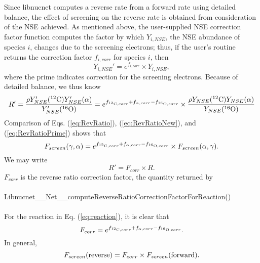 \documentclass{article}    %
\begin{document}
Since libnucnet computes a reverse rate from a forward rate using detailed
balance, the effect of screening on the reverse rate is obtained from
consideration of the NSE achieved.
As mentioned above,
the user-supplied NSE correction factor function
computes the factor by which $Y_{i,NSE}$, the
NSE abundance of species $i$,
changes due to the screening electrons; thus, if the user's routine
returns the correction factor $f_{i,corr}$ for species $i$, then
\begin{equation}
Y_{i,NSE}' = e^{f_{i,corr}} \times Y_{i,NSE},
\label{eq:newNse}
\end{equation}
where the prime indicates correction for the screening electrons.  Because
of detailed balance, we thus know
\begin{equation}
R' =
\frac{\rho Y_{NSE}'(^{12}{\rm C}) Y_{NSE}'(\alpha )}{Y_{NSE}'(^{16}{\rm O})}
= e^{f_{^{12}{\rm C},corr} + f_{\alpha,corr} - f_{^{16}{\rm O},corr}} \times
\frac{\rho Y_{NSE}(^{12}{\rm C}) Y_{NSE}(\alpha )}{Y_{NSE}(^{16}{\rm O})}
\label{eq:RevRatioPrime}
\end{equation}
Comparison of Eqs. (\ref{eq:RevRatio}), (\ref{eq:RevRatioNew}),
and (\ref{eq:RevRatioPrime}) shows that
\begin{equation}
F_{screen}(\gamma,\alpha) =
e^{f_{^{12}{\rm C},corr} + f_{\alpha,corr} - f_{^{16}{\rm O},corr} } \times
F_{screen}(\alpha,\gamma).
\end{equation}
We may write
\begin{equation}
R' = F_{corr} \times R.
\end{equation}
$F_{corr}$ is the reverse ratio correction factor, the quantity returned by\\
\\
Libnucnet\_\_Net\_\_computeReverseRatioCorrectionFactorForReaction()\\
\\
For the reaction in Eq. (\ref{eq:reaction}), it is clear that
\begin{equation}
F_{corr} = e^{f_{^{12}{\rm C},corr} + f_{\alpha,corr} - f_{^{16}{\rm O},corr}}.
\end{equation}
In general,
\begin{equation}
F_{screen}({\rm reverse}) = F_{corr} \times F_{screen}({\rm forward}).
\end{equation}
\end{document}
